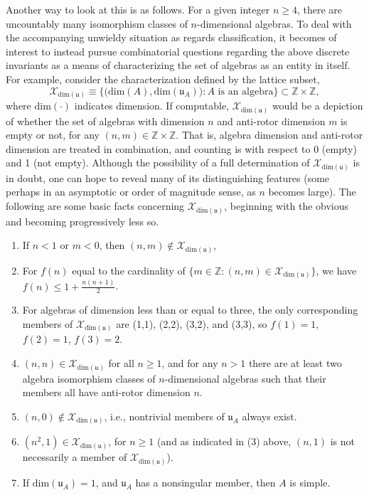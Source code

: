 \documentclass{amsart}
\numberwithin{equation}{section}
\theoremstyle{definition}
\numberwithin{theorem}{section}
\begin{document}
Another way to look at this is as follows.
For a given integer $n\ge 4$, there are uncountably many isomorphism classes of $n$-dimensional algebras.  To deal with the accompanying unwieldy situation as regards classification, it becomes of interest to instead pursue combinatorial questions regarding the above discrete invariants as a means of characterizing the set of algebras as an entity in itself.   For example, consider the characterization defined by the lattice subset, \[ \mathcal{X}_{\text{dim}(\mathfrak{u})} \equiv \big\{\big(\text{dim}(A),\text{dim}(\mathfrak{u}_A)\big): A \text{ is an algebra}\big\} \subset \mathbb{Z}\times\mathbb{Z},\] where $\text{dim}(\cdot)$ indicates dimension.  If computable, $\mathcal{X}_{\text{dim}(\mathfrak{u})}$ would be a depiction of whether the set of algebras with dimension $n$ and anti-rotor dimension $m$ is empty or not, for any $(n,m)\in \mathbb{Z}\times\mathbb{Z}$.  That is, algebra dimension and anti-rotor dimension are treated in combination, and counting is with respect to 0 (empty) and 1 (not empty). Although the possibility of a full determination of $\mathcal{X}_{\text{dim}(\mathfrak{u})}$ is in doubt, one can hope to reveal many of its distinguishing features (some perhaps in an  asymptotic or order of magnitude sense, as $n$ becomes large). The following are some basic facts concerning $\mathcal{X}_{\text{dim}(\mathfrak{u})}$, beginning with the obvious and becoming progressively less so.

  \begin{enumerate} \item If $n<1$ or $m<0$, then $(n,m)\notin \mathcal{X}_{\text{dim}(\mathfrak{u})}$, \item  For $f(n)$ equal to the cardinality of $\{m\in\mathbb{Z}:(n,m)\in \mathcal{X}_{\text{dim}(\mathfrak{u})}\}$, we have $f(n)\le  1+\frac{n(n+1)}{2}$. \item For algebras of dimension less than or equal to three, the only corresponding members of $\mathcal{X}_{\text{dim}(\mathfrak{u})}$ are (1,1), (2,2), (3,2), and (3,3), so $f(1)=1$, $f(2)=1$, $f(3)=2$.  \item  $(n,n)\in \mathcal{X}_{\text{dim}(\mathfrak{u})}$ for all $n\ge 1$, and for any $n>1$ there are at least two algebra isomorphism classes of $n$-dimensional algebras such that their members all have anti-rotor dimension $n$.  \item $(n,0)\notin \mathcal{X}_{\text{dim}(\mathfrak{u})}$, i.e., nontrivial members of $\mathfrak{u}_A$ always exist.  \item  $(n^2,1)\in \mathcal{X}_{\text{dim}(\mathfrak{u})}$, for $n\ge 1$ (and as indicated in (3) above, $(n,1)$ is not necessarily a member of $\mathcal{X}_{\text{dim}(\mathfrak{u})}$). 
\item If $\text{dim}(\mathfrak{u}_A) = 1$, and $\mathfrak{u}_A$ has a nonsingular member, then $A$ is simple.
\end{enumerate}
  
\end{document}
